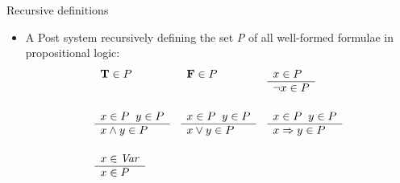 \begin{wideslide}[bm=,toc=]{Recursive definitions}
\begin{itemize}
\item A Post system recursively defining the set {\em P\/} of all well-formed formulae in propositional logic:
\begin{displaymath}
\begin{array}{lll}
        \begin{array}[t]{l}
        \mbox{\bf T}\in P
        \end{array}
&
        \begin{array}[t]{l}
        \mbox{\bf F}\in P
        \end{array}
&
	\begin{array}[t]{l}
        x \in P \\
        \hline
        \neg x \in P
        \end{array} \\[6ex]

	\begin{array}[t]{l}
	x \in P \;\;y \in P \\
	\hline
	x \wedge y \in P
	\end{array}
&
	\begin{array}[t]{l}
	x \in P \;\;y \in P \\
	\hline
	x \vee y \in P
	\end{array}
&
	\begin{array}[t]{l}
	x \in P \;\;y \in P \\
	\hline
	x \Rightarrow y \in P
	\end{array} \\[6ex]

	\begin{array}[t]{l}
        x \in \mbox{\it Var\/} \\
        \hline
        x \in P
        \end{array}
\end{array}
\end{displaymath}
\end{itemize}
\end{wideslide}

